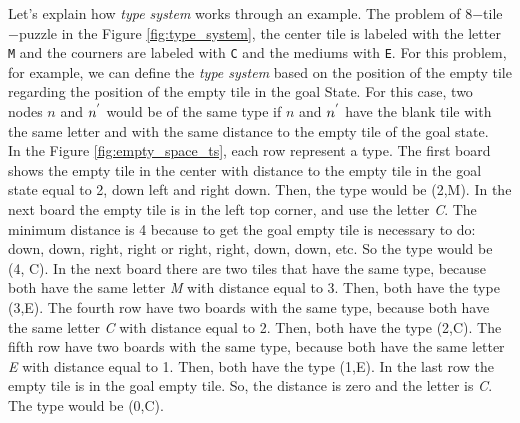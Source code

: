 Let's explain how \textit{type system} works through an example. The problem of 8$-$tile$-$puzzle in the Figure \ref{fig:type_system}, the center tile is labeled with the letter \texttt{M} and the courners are labeled with \texttt{C} and the mediums with \texttt{E}. For this problem, for example, we can define the \textit{type system} based on the position of the empty tile regarding the position of the empty tile in the goal State. For this case, two nodes $n$ and $n\sp{'}$ would be of the same type if $n$ and $n\sp{'}$ have the blank tile with the same letter and with the same distance to the empty tile of the goal state.\\

In the Figure \ref{fig:empty_space_ts}, each row represent a type. The first board shows the empty tile in the center with distance to the empty tile in the goal state equal to 2, down left and right down. Then, the type would be (2,M). In the next board the empty tile is in the left top corner, and use the letter \textit{C}. The minimum distance is 4 because to get the goal empty tile is necessary to do: down, down, right, right or right, right, down, down, etc. So the type would be (4, C). In the next board there are two tiles that have the same type, because both have the same letter \textit{M} with distance equal to 3. Then, both have the type (3,E). The fourth row have two boards with the same type, because both have the same letter \textit{C} with distance equal to 2. Then, both have the type (2,C). The fifth row have two boards with the same type, because both have the same letter \textit{E} with distance equal to 1. Then, both have the type (1,E). In the last row the empty tile is in the goal empty tile. So, the distance is zero and the letter is \textit{C}. The type would be (0,C).

